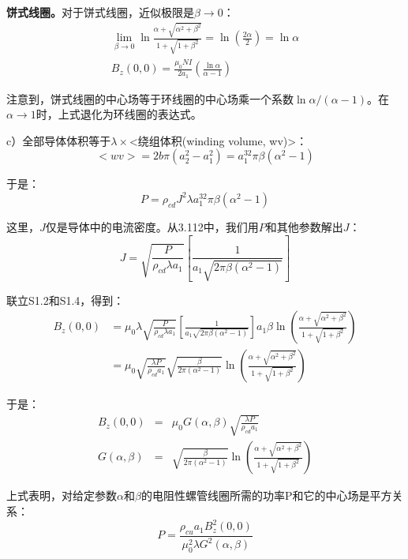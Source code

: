\textbf{饼式线圈。}对于饼式线圈，近似极限是$\beta\rightarrow 0$：
\begin{eqnarray}
\lim_{\beta\rightarrow 0}\ln\frac{\alpha+\sqrt{\alpha^2+\beta^2}}{1+\sqrt{1+\beta^2}}=\ln\left(\frac{2\alpha}{2}\right)=\ln\alpha\\%
B_z(0,0)=\frac{\mu_0NI}{2a_1}\left(\frac{\ln\alpha}{\alpha-1}\right)%
\end{eqnarray}

注意到，饼式线圈的中心场等于环线圈的中心场乘一个系数$\ln \alpha/(\alpha-1)$。在$\alpha\rightarrow 1$时，上式退化为环线圈的表达式。

c）全部导体体积等于$\lambda\times$<绕组体积(winding volume, wv)>：
\begin{equation}
<wv>=2b\pi(a_2^2-a_1^2)=a_1^32\pi\beta(\alpha^2-1)%
\end{equation}

于是：
\begin{equation}
P=\rho_{cd}J^2\lambda a_1^32\pi\beta(\alpha^2-1)%
\end{equation}

这里，$J$仅是导体中的电流密度。从3.112中，我们用$P$和其他参数解出$J$：
\begin{equation}
J=\sqrt{\frac{P}{\rho_{cd}\lambda a_1}}\left[\frac{1}{a_1\sqrt{2\pi\beta(\alpha^2-1)}}\right]%
\end{equation}

联立S1.2和S1.4，得到：
\begin{equation}
\begin{split}
B_z(0,0)&=\mu_0\lambda\sqrt{\frac{P}{\rho_{cd}\lambda a_1}}\left[\frac{1}{a_1\sqrt{2\pi\beta(\alpha^2-1)}}\right]a_1\beta\ln(\frac{\alpha+\sqrt{\alpha^2+\beta^2}}{1+\sqrt{1+\beta^2}})\\
&=\mu_0\sqrt{\frac{\lambda P}{\rho_{cd}a_1}}\sqrt{\frac{\beta}{2\pi(\alpha^2-1)}}\ln\left(\frac{\alpha+\sqrt{\alpha^2+\beta^2}}{1+\sqrt{1+\beta^2}}\right)%
\end{split}
\end{equation}

于是：
\begin{eqnarray}
B_z(0,0)&=&\mu_0G(\alpha,\beta)\sqrt{\frac{\lambda P}{\rho_{cd}a_1}}\\ %
G(\alpha,\beta)&=&\sqrt{\frac{\beta}{2\pi(\alpha^2-1)}}\ln\left(\frac{\alpha+\sqrt{\alpha^2+\beta^2}}{1+\sqrt{1+\beta^2}}\right)%
\end{eqnarray}

上式表明，对给定参数$\alpha$和$\beta$的电阻性螺管线圈所需的功率P和它的中心场是平方关系：
\begin{equation}
P=\frac{\rho_{cu}a_1B_z^2(0,0)}{\mu_0^2\lambda G^2(\alpha,\beta)}%
\end{equation}

